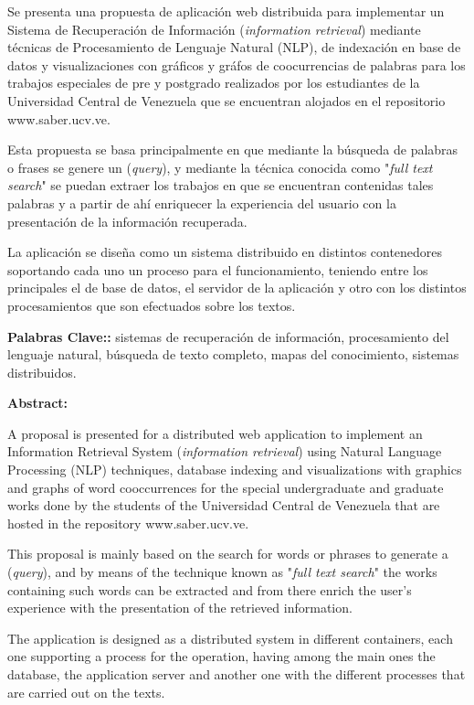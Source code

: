 Se presenta una propuesta de aplicación web distribuida para implementar un Sistema de Recuperación de Información (\emph{information retrieval}) mediante técnicas de Procesamiento de Lenguaje Natural (NLP), de indexación en base de datos y visualizaciones con gráficos y gráfos de coocurrencias de palabras para los trabajos especiales de pre y postgrado realizados por los estudiantes de la Universidad Central de Venezuela que se encuentran alojados en el repositorio www.saber.ucv.ve.

Esta propuesta se basa principalmente en que mediante la búsqueda de palabras o frases se genere un (\emph{query}), y mediante la técnica conocida como "\emph{full text search}" se puedan extraer los trabajos en que se encuentran contenidas tales palabras y a partir de ahí enriquecer la experiencia del usuario con la presentación de la información recuperada.

La aplicación se diseña como un sistema distribuido en distintos contenedores soportando cada uno un proceso para el funcionamiento, teniendo entre los principales el de base de datos, el servidor de la aplicación y otro con los distintos procesamientos que son efectuados sobre los textos.

\textbf{Palabras Clave::} sistemas de recuperación de información, procesamiento del lenguaje natural, búsqueda de texto completo, mapas del conocimiento, sistemas distribuidos.

\vspace*{2cm}

\large{\textbf{Abstract:}}

A proposal is presented for a distributed web application to implement an Information Retrieval System (\emph{information retrieval}) using Natural Language Processing (NLP) techniques, database indexing and visualizations with graphics and graphs of word cooccurrences for the special undergraduate and graduate works done by the students of the Universidad Central de Venezuela that are hosted in the repository www.saber.ucv.ve.

This proposal is mainly based on the search for words or phrases to generate a (\emph{query}), and by means of the technique known as "\emph{full text search}" the works containing such words can be extracted and from there enrich the user's experience with the presentation of the retrieved information.

The application is designed as a distributed system in different containers, each one supporting a process for the operation, having among the main ones the database, the application server and another one with the different processes that are carried out on the texts.

